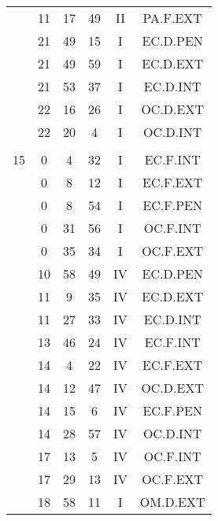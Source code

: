 \documentclass[12pt, a4paper]{article}
\begin{document}
\begin{multicols}{3}
{\begin{tabular}{c c c c c c}
	 	 	 	 & 11 & 17 & 49 & II & PA.F.EXT\\%
	 	 	 	 & 21 & 49 & 15 & I & EC.D.PEN\\%
	 	 	 	 & 21 & 49 & 59 & I & EC.D.EXT\\%
	 	 	 	 & 21 & 53 & 37 & I & EC.D.INT\\%
	 	 	 	 & 22 & 16 & 26 & I & OC.D.EXT\\%
	 	 	 	 & 22 & 20 & 4 & I & OC.D.INT\\%
	 	 	 	 & & & & & \\%
	 	 	 	15 & 0 & 4 & 32 & I & EC.F.INT\\%
	 	 	 	 & 0 & 8 & 12 & I & EC.F.EXT\\%
	 	 	 	 & 0 & 8 & 54 & I & EC.F.PEN\\%
	 	 	 	 & 0 & 31 & 56 & I & OC.F.INT\\%
	 	 	 	 & 0 & 35 & 34 & I & OC.F.EXT\\%
	 	 	 	 & 10 & 58 & 49 & IV & EC.D.PEN\\%
	 	 	 	 & 11 & 9 & 35 & IV & EC.D.EXT\\%
	 	 	 	 & 11 & 27 & 33 & IV & EC.D.INT\\%
	 	 	 	 & 13 & 46 & 24 & IV & EC.F.INT\\%
	 	 	 	 & 14 & 4 & 22 & IV & EC.F.EXT\\%
	 	 	 	 & 14 & 12 & 47 & IV & OC.D.EXT\\%
	 	 	 	 & 14 & 15 & 6 & IV & EC.F.PEN\\%
	 	 	 	 & 14 & 28 & 57 & IV & OC.D.INT\\%
	 	 	 	 & 17 & 13 & 5 & IV & OC.F.INT\\%
	 	 	 	 & 17 & 29 & 13 & IV & OC.F.EXT\\%
	 	 	 	 & 18 & 58 & 11 & I & OM.D.EXT\\%

\end{tabular}}
\end{multicols}
\end{document}
